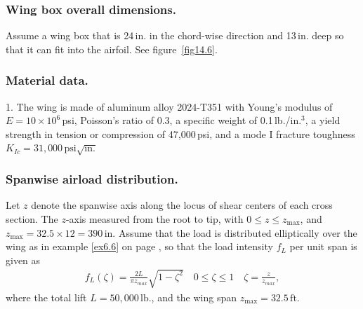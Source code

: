 \documentclass{AeroStructure-ERJohnson}
\begin{document}
\subsubsection{Wing box overall dimensions.} Assume a wing box that is 24\,in. in the chord-wise direction and 13\,in. deep so that it can fit into the airfoil. See figure~\ref{fig14.6}.

\vspace*{-1\baselineskip}
{\def\thefigure{14.6}
}
\vspace*{-0.6\baselineskip}

\subsubsection{Material data.}

1. The wing is made of aluminum alloy 2024-T351 with Young's modulus of $E=10 \times 10^{6}$\,psi, Poisson's ratio of 0.3, a specific weight of 0.1\,lb./in.$^3$, a yield strength in tension or compression of 47{,}000\,psi, and a mode I fracture toughness $K_{I c}=31{,}000\,\mathrm{psi} \sqrt{\mathrm{in.}}$

\subsubsection{Spanwise airload distribution.} Let $z$ denote the spanwise axis along the locus of shear centers of each cross section. The $z$-axis measured from the root to tip, with $0 \leq z \leq z_{\max }$, and
 $z_{\max }=32.5 \times 12=390\,\mathrm{in}.$ Assume that the load is distributed elliptically over the wing as in example \ref{ex6.6} on page \pageref{ex6.6}, so that the load intensity $f_{L}$ per unit span is given as
\begin{align}\label{eq14.24}
f_{L}(\zeta)=\frac{2 L}{\pi z_{max }} \sqrt{1-\zeta^{2}} \quad 0 \leq \zeta \leq 1 \quad \zeta=\frac{z}{z_{max }},
\end{align}
where the total lift $L=50{,}000\,\mathrm{lb.}$, and the wing span $z_{\max }=32.5\,\mathrm{ft.}$
\end{document}
